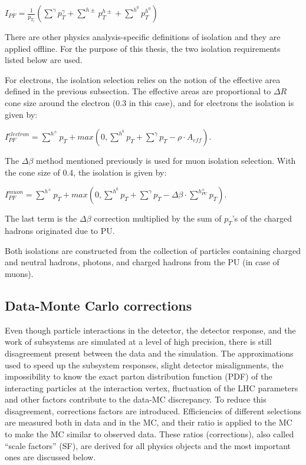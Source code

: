 $I_{PF} = \frac{1}{p_{T_\ell}} (\sum^\gamma p^\gamma_T + \sum^{h \pm} p^{h \pm}_T + \sum^{h^0} p^{h^0 }_T)$

There are other physics analysis-specific definitions of isolation and they are applied offline. For the purpose of this thesis, the two isolation requirements listed below are used.

For electrons, the isolation selection relies on the notion of the effective area defined in the previous subsection. The effective areas are proportional to $\Delta R$ cone size around the electron (0.3 in this case), and for electrons the isolation is given by: 

$I^{electron}_{PF} = \sum^{h^\pm} p_T + max (0, \sum^{h^0} p_T + \sum^\gamma p_T - \rho \cdot A_{eff})$.

The $\Delta\beta$ method mentioned previously is used for muon isolation selection. With the cone size of 0.4, the isolation is given by:

$I^{muon}_{PF} = \sum^{h^\pm} p_T + max (0, \sum^{h^0} p_T + \sum^\gamma p_T - \Delta \beta  \cdot  \sum^{h^\pm_{PU}} p_T)$.

\noindent The last term is the $\Delta \beta$ correction multiplied by the sum of $p_T$'s of the charged hadrons originated due to PU.

Both isolations are constructed from the collection of particles containing charged and neutral hadrons, photons, and charged hadrons from the PU (in case of muons).


\subsection{Data-Monte Carlo corrections}\label{sec:data_mc}

Even though particle interactions in the detector, the detector response, and the work of subsystems are simulated at a level of high precision, there is still disagreement present between the data and the simulation. The approximations used to speed up the subsystem responses, slight detector misalignments, the impossibility to know the exact parton distribution function (PDF) of the interacting particles at the interaction vertex, fluctuation of the LHC parameters and other factors contribute to the data-MC discrepancy. To reduce this disagreement, corrections factors are introduced. Efficiencies of different selections are measured both in data and in the MC, and their ratio is applied to the MC to make the MC similar to observed data. These ratios (corrections), also called ``scale factors'' (SF), are derived for all physics objects and the most important ones are discussed below.

